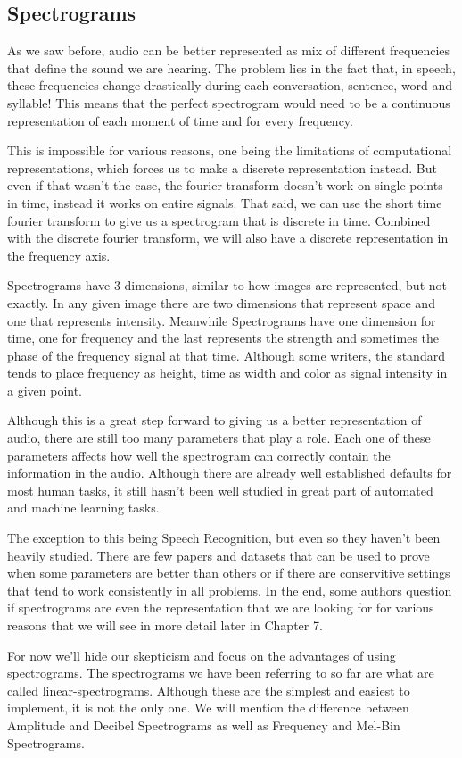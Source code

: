\documentclass{book}
\begin{document}
\begin{appendices}
\chapter{Spectrograms}
\qquad As we saw before, audio can be better represented as mix of different frequencies that define the sound we are hearing. The problem lies in the fact that, in speech, these frequencies change drastically during each conversation, sentence, word and syllable! This means that the perfect spectrogram would need to be a continuous representation of each moment of time and for every frequency.
\par
This is impossible for various reasons, one being the limitations of computational representations, which forces us to make a discrete representation instead. But even if that wasn’t the case, the fourier transform doesn’t work on single points in time, instead it works on entire signals. That said, we can use the short time fourier transform to give us a spectrogram that is discrete in time. Combined with the discrete fourier transform, we will also have a discrete representation in the frequency axis.
\par
Spectrograms have 3 dimensions, similar to how images are represented, but not exactly. In any given image there are two dimensions that represent space and one that represents intensity. Meanwhile Spectrograms have one dimension for time, one for frequency and the last represents the strength and sometimes the phase of the frequency signal at that time. Although some writers, the standard tends to place frequency as height, time as width and color as signal intensity in a given point.
\par
Although this is a great step forward to giving us a better representation of audio, there are still too many parameters that play a role. Each one of these parameters affects how well the spectrogram can correctly contain the information in the audio. Although there are already well established defaults for most human tasks, it still hasn’t been well studied in great part of automated and machine learning tasks.
\par
The exception to this being Speech Recognition, but even so they haven’t been heavily studied. There are few papers and datasets that can be used to prove when some parameters are better than others or if there are conservitive settings that tend to work consistently in all problems. In the end, some authors question if spectrograms are even the representation that we are looking for for various reasons that we will see in more detail later in Chapter 7.
\par
For now we'll hide our skepticism and focus on the advantages of using spectrograms. The spectrograms we have been referring to so far are what are called linear-spectrograms. Although these are the simplest and easiest to implement, it is not the only one. We will mention the difference between Amplitude and Decibel Spectrograms as well as Frequency and Mel-Bin Spectrograms.

\end{appendices}
\end{document}
